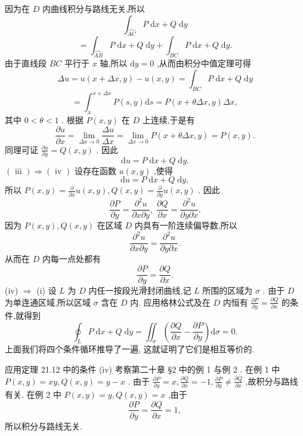 因为在 \(D\) 内曲线积分与路线无关,所以
\[
{\int }_{\overset{⏜}{AC}}P\mathrm{\;d}x + Q\mathrm{\;d}y
\]
\[
= {\int }_{\overset{⏜}{AB}}P\mathrm{\;d}x + Q\mathrm{\;d}y + {\int }_{BC}P\mathrm{\;d}x + Q\mathrm{\;d}y.
\]
由于直线段 \({BC}\) 平行于 \(x\) 轴,所以 \(\mathrm{d}y = 0\) ,从而由积分中值定理可得
\[
{\Delta u} = u\left( {x + {\Delta x},y}\right)  - u\left( {x,y}\right)  = {\int }_{BC}P\mathrm{\;d}x + Q\mathrm{\;d}y
\]
\[
= {\int }_{x}^{x + {\Delta x}}P\left( {s,y}\right) \mathrm{d}s = P\left( {x + {\theta \Delta x},y}\right) {\Delta x},
\]
其中 \(0 < \theta  < 1\) . 根据 \(P\left( {x,y}\right)\) 在 \(D\) 上连续,于是有
\[
\frac{\partial u}{\partial x} = \mathop{\lim }\limits_{{{\Delta x} \rightarrow  0}}\frac{\Delta u}{\Delta x} = \mathop{\lim }\limits_{{{\Delta x} \rightarrow  0}}P\left( {x + {\theta \Delta x},y}\right)  = P\left( {x,y}\right) .
\]
同理可证 \(\frac{\partial u}{\partial y} = Q\left( {x,y}\right)\) . 因此
\[
\mathrm{d}u = P\mathrm{\;d}x + Q\mathrm{\;d}y.
\]
\(\left( \text{ iii }\right)  \Rightarrow  \left( \text{ iv }\right)\) 设存在函数 \(u\left( {x,y}\right)\) ,使得
\[
\mathrm{d}u = P\mathrm{\;d}x + Q\mathrm{\;d}y,
\]
所以 \(P\left( {x,y}\right)  = \frac{\partial }{\partial x}u\left( {x,y}\right) ,Q\left( {x,y}\right)  = \frac{\partial }{\partial y}u\left( {x,y}\right)\) . 因此
\[
\frac{\partial P}{\partial y} = \frac{{\partial }^{2}u}{\partial x\partial y},\;\frac{\partial Q}{\partial x} = \frac{{\partial }^{2}u}{\partial y\partial x}.
\]
因为 \(P\left( {x,y}\right) ,Q\left( {x,y}\right)\) 在区域 \(D\) 内具有一阶连续偏导数,所以
\[
\frac{{\partial }^{2}u}{\partial x\partial y} = \frac{{\partial }^{2}u}{\partial y\partial x}.
\]
从而在 \(D\) 内每一点处都有
\[
\frac{\partial P}{\partial y} = \frac{\partial Q}{\partial x}.
\]
(iv) \(\Rightarrow\) (i) 设 \(L\) 为 \(D\) 内任一按段光滑封闭曲线,记 \(L\) 所围的区域为 \(\sigma\) . 由于 \(D\) 为单连通区域,所以区域 \(\sigma\) 含在 \(D\) 内. 应用格林公式及在 \(D\) 内恒有 \(\frac{\partial P}{\partial y} = \frac{\partial Q}{\partial x}\) 的条件,就得到
\[
{\oint }_{L}P\mathrm{\;d}x + Q\mathrm{\;d}y = {\iint }_{\sigma }\left( {\frac{\partial Q}{\partial x} - \frac{\partial P}{\partial y}}\right) \mathrm{d}\sigma  = 0.
\]
上面我们将四个条件循环推导了一遍, 这就证明了它们是相互等价的.

应用定理 21.12 中的条件 (iv) 考察第二十章 §2 中的例 1 与例 2 . 在例 1 中 \(P\left( {x,y}\right)  = {xy},Q\left( {x,y}\right)  = y - x\) . 由于 \(\frac{\partial P}{\partial y} = x,\frac{\partial Q}{\partial x} =  - 1,\frac{\partial P}{\partial y} \neq  \frac{\partial Q}{\partial x}\) ,故积分与路线有关. 在例 2 中 \(P\left( {x,y}\right)  = y,Q\left( {x,y}\right)  = x\) ,由于
\[
\frac{\partial P}{\partial y} = \frac{\partial Q}{\partial x} = 1,
\]
所以积分与路线无关.


